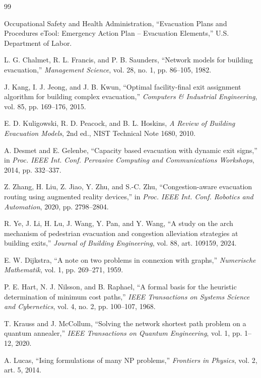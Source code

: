 \documentclass[11pt]{article}
\begin{document}
\begin{thebibliography}{99}

 Occupational Safety and Health Administration, ``Evacuation Plans and Procedures eTool: Emergency Action Plan -- Evacuation Elements,'' U.S. Department of Labor.

 L. G. Chalmet, R. L. Francis, and P. B. Saunders, ``Network models for building evacuation,'' \textit{Management Science}, vol. 28, no. 1, pp. 86--105, 1982.

 J. Kang, I. J. Jeong, and J. B. Kwun, ``Optimal facility-final exit assignment algorithm for building complex evacuation,'' \textit{Computers \& Industrial Engineering}, vol. 85, pp. 169--176, 2015.

 E. D. Kuligowski, R. D. Peacock, and B. L. Hoskins, \textit{A Review of Building Evacuation Models}, 2nd ed., NIST Technical Note 1680, 2010.

 A. Desmet and E. Gelenbe, ``Capacity based evacuation with dynamic exit signs,'' in \textit{Proc. IEEE Int. Conf. Pervasive Computing and Communications Workshops}, 2014, pp. 332--337.

 Z. Zhang, H. Liu, Z. Jiao, Y. Zhu, and S.-C. Zhu, ``Congestion-aware evacuation routing using augmented reality devices,'' in \textit{Proc. IEEE Int. Conf. Robotics and Automation}, 2020, pp. 2798--2804.

 R. Ye, J. Li, H. Lu, J. Wang, Y. Pan, and Y. Wang, ``A study on the arch mechanism of pedestrian evacuation and congestion alleviation strategies at building exits,'' \textit{Journal of Building Engineering}, vol. 88, art. 109159, 2024.

 E. W. Dijkstra, ``A note on two problems in connexion with graphs,'' \textit{Numerische Mathematik}, vol. 1, pp. 269--271, 1959.

 P. E. Hart, N. J. Nilsson, and B. Raphael, ``A formal basis for the heuristic determination of minimum cost paths,'' \textit{IEEE Transactions on Systems Science and Cybernetics}, vol. 4, no. 2, pp. 100--107, 1968.

 T. Krauss and J. McCollum, ``Solving the network shortest path problem on a quantum annealer,'' \textit{IEEE Transactions on Quantum Engineering}, vol. 1, pp. 1--12, 2020.

 A. Lucas, ``Ising formulations of many NP problems,'' \textit{Frontiers in Physics}, vol. 2, art. 5, 2014.


\end{thebibliography}
\end{document}
